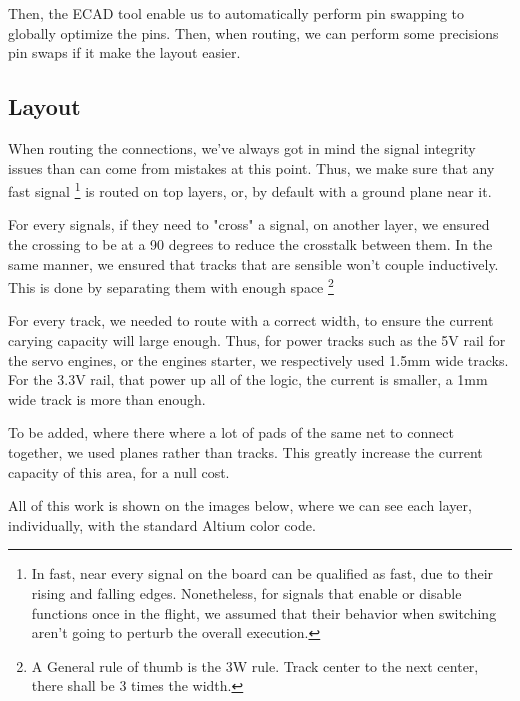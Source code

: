 Then, the ECAD tool enable us to automatically perform pin swapping to globally optimize the pins. 
Then, when routing, we can perform some precisions pin swaps if it make the layout easier.

\subsection{Layout}
When routing the connections, we've always got in mind the signal integrity issues than can come 
from mistakes at this point. 
Thus, we make sure that any fast signal \footnote{
    In fast, near every signal on the board can be qualified as fast, due to their rising and falling 
    edges. Nonetheless, for signals that enable or disable functions once in the flight, we assumed 
    that their behavior when switching aren't going to perturb the overall execution.
} is routed on top layers, or, by default with a ground plane near it. 

For every signals, if they need to "cross" a signal, on another layer, we ensured the crossing to be 
at a 90 degrees to reduce the crosstalk between them. In the same manner, we ensured that tracks that
are sensible won't couple inductively. This is done by separating them with enough space \footnote{A
    General rule of thumb is the 3W rule. Track center to the next center, there shall be 3 times the 
    width.}

For every track, we needed to route with a correct width, to ensure the current carying capacity will
large enough. Thus, for power tracks such as the 5V rail for the servo engines, or the engines starter,
we respectively used 1.5mm wide tracks. For the 3.3V rail, that power up all of the logic, the current
is smaller, a 1mm wide track is more than enough.

To be added, where there where a lot of pads of the same net to connect together, we used planes rather
than tracks. This greatly increase the current capacity of this area, for a null cost.

All of this work is shown on the images below, where we can see each layer, individually, with the 
standard Altium color code.

